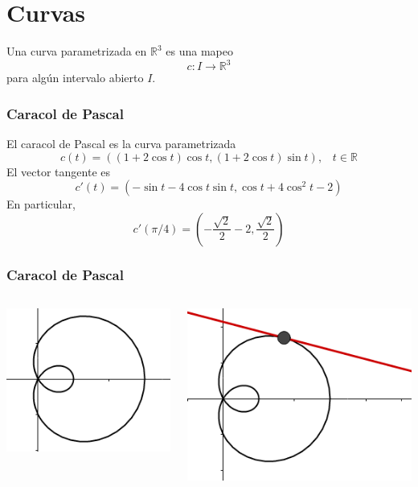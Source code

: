 \documentclass[spanish]{beamer}
\def\realR{\mathbb{R}} %
\begin{document}
\section{Curvas}

\begin{frame}
    \begin{definition}
        Una curva parametrizada en $\realR^{3}$ es una mapeo 
        $$c:I \rightarrow \realR^{3}$$
        para alg\'un intervalo abierto $I$.
    \end{definition}
\end{frame}

\begin{frame}
    \frametitle{Caracol de Pascal}
    El caracol de Pascal es la curva parametrizada
    $$ c(t)=((1+2\cos{t})\cos{t},(1+2\cos{t})\sin{t})\text{,} \quad t \in \realR$$
    El vector tangente es
    $$ c'(t)=(-\sin{t}-4\cos{t}\sin{t},\cos{t}+4\cos^{2}{t}-2)$$
    En particular,
    $$ c'(\pi/4) = (-\frac{\sqrt{2}}{2}-2,\frac{\sqrt{2}}{2})$$
\end{frame}

\begin{frame}
    \frametitle{Caracol de Pascal}
    \begin{columns}
        \begin{center}
            \includegraphics[scale=0.5]{../gfx/limacon2}
        \end{center}
        \begin{center}
            \includegraphics[scale=0.5]{../gfx/limacon}
        \end{center}
    \end{columns}
\end{frame}
\end{document}
